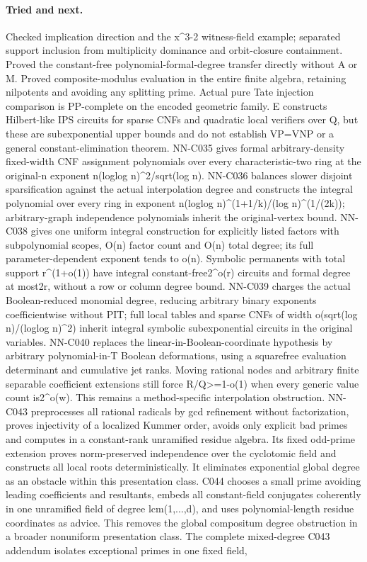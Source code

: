 \paragraph{Tried and next.} Checked implication direction and the x\textasciicircum{}3-2 witness-field example; separated support inclusion from multiplicity dominance and orbit-closure containment. Proved the constant-free polynomial-formal-degree transfer directly without A or M. Proved composite-modulus evaluation in the entire finite algebra, retaining nilpotents and avoiding any splitting prime. Actual pure Tate injection comparison is PP-complete on the encoded geometric family. E constructs Hilbert-like IPS circuits for sparse CNFs and quadratic local verifiers over Q, but these are subexponential upper bounds and do not establish VP=VNP or a general constant-elimination theorem. NN-C035 gives formal arbitrary-density fixed-width CNF assignment polynomials over every characteristic-two ring at the original-n exponent n(loglog n)\textasciicircum{}2/sqrt(log n). NN-C036 balances slower disjoint sparsification against the actual interpolation degree and constructs the integral polynomial over every ring in exponent n(loglog n)\textasciicircum{}(1+1/k)/(log n)\textasciicircum{}(1/(2k)); arbitrary-graph independence polynomials inherit the original-vertex bound. NN-C038 gives one uniform integral construction for explicitly listed factors with subpolynomial scopes, O(n) factor count and O(n) total degree; its full parameter-dependent exponent tends to o(n). Symbolic permanents with total support r\textasciicircum{}(1+o(1)) have integral constant-free2\textasciicircum{}o(r) circuits and formal degree at most2r, without a row or column degree bound. NN-C039 charges the actual Boolean-reduced monomial degree, reducing arbitrary binary exponents coefficientwise without PIT; full local tables and sparse CNFs of width o(sqrt(log n)/(loglog n)\textasciicircum{}2) inherit integral symbolic subexponential circuits in the original variables. NN-C040 replaces the linear-in-Boolean-coordinate hypothesis by arbitrary polynomial-in-T Boolean deformations, using a squarefree evaluation determinant and cumulative jet ranks. Moving rational nodes and arbitrary finite separable coefficient extensions still force R/Q>=1-o(1) when every generic value count is2\textasciicircum{}o(w). This remains a method-specific interpolation obstruction. NN-C043 preprocesses all rational radicals by gcd refinement without factorization, proves injectivity of a localized Kummer order, avoids only explicit bad primes and computes in a constant-rank unramified residue algebra. Its fixed odd-prime extension proves norm-preserved independence over the cyclotomic field and constructs all local roots deterministically. It eliminates exponential global degree as an obstacle within this presentation class. C044 chooses a small prime avoiding leading coefficients and resultants, embeds all constant-field conjugates coherently in one unramified field of degree lcm(1,...,d), and uses polynomial-length residue coordinates as advice. This removes the global compositum degree obstruction in a broader nonuniform presentation class. The complete mixed-degree C043 addendum isolates exceptional primes in one fixed field, 